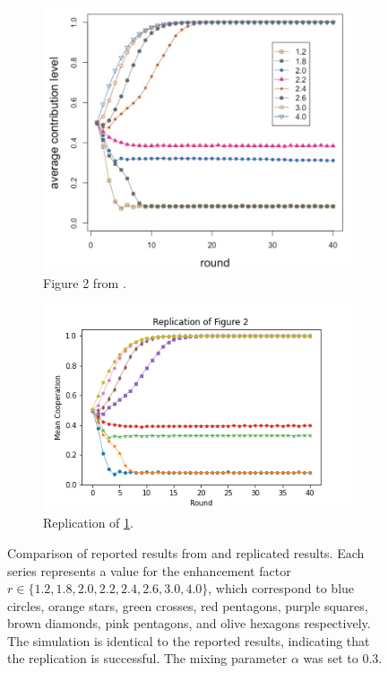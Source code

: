 \FloatBarrier 
\begin{figure}[!h]
  \begin{subfigure}[b]{0.45\textwidth}
    \includegraphics[width=\textwidth]{images/TAfig2_real.png}
    \caption{Figure 2 from \cite{RN49}. }
    \label{TAfig2_real}
  \end{subfigure}
  \hfill
  \begin{subfigure}[b]{0.45\textwidth}
    \includegraphics[width=1.25\textwidth]{images/TAfig2.png}
    \caption{Replication of \ref{TAfig2_real}. }
    \label{TAfig2}
  \end{subfigure}
  \caption{Comparison of reported results from \cite{RN49} and replicated results. Each series represents a value for the enhancement factor $r \in \{1.2, 1.8, 2.0, 2.2, 2.4, 2.6, 3.0, 4.0\}$, which correspond to blue circles, orange stars, green crosses, red pentagons, purple squares, brown diamonds, pink pentagons, and olive hexagons respectively. The simulation is identical to the reported results, indicating that the replication is successful. The mixing parameter $\alpha$ was set to 0.3.} \label{comp0}
\end{figure} 
\FloatBarrier

